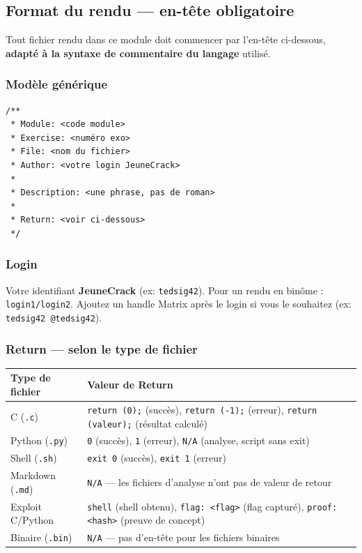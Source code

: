 \subsection*{Format du rendu --- en-tête obligatoire}

Tout fichier rendu dans ce module doit commencer par l'en-tête
ci-dessous, \textbf{adapté à la syntaxe de commentaire du langage}
utilisé.

\subsubsection*{Modèle générique}

\begin{verbatim}
/**
 * Module: <code module>
 * Exercise: <numéro exo>
 * File: <nom du fichier>
 * Author: <votre login JeuneCrack>
 *
 * Description: <une phrase, pas de roman>
 *
 * Return: <voir ci-dessous>
 */
\end{verbatim}

\subsubsection*{Login}

Votre identifiant \textbf{JeuneCrack} (ex: \texttt{tedsig42}).
Pour un rendu en binôme : \texttt{login1/login2}.
Ajoutez un handle Matrix après le login si vous le souhaitez
(ex: \texttt{tedsig42 @tedsig42}).

\subsubsection*{Return --- selon le type de fichier}

\begin{tabularx}{\linewidth}{lX}
  \toprule
  \textbf{Type de fichier} & \textbf{Valeur de Return} \\
  \midrule
  C (\texttt{.c}) &
  \texttt{return (0);} (succès),
  \texttt{return (-1);} (erreur),
  \texttt{return (valeur);} (résultat calculé) \\

  Python (\texttt{.py}) &
  \texttt{0} (succès),
  \texttt{1} (erreur),
  \texttt{N/A} (analyse, script sans exit) \\

  Shell (\texttt{.sh}) &
  \texttt{exit 0} (succès),
  \texttt{exit 1} (erreur) \\

  Markdown (\texttt{.md}) &
  \texttt{N/A} --- les fichiers d'analyse n'ont pas de valeur de retour \\

  Exploit C/Python &
  \texttt{shell} (shell obtenu),
  \texttt{flag: <flag>} (flag capturé),
  \texttt{proof: <hash>} (preuve de concept) \\

  Binaire (\texttt{.bin}) &
  \texttt{N/A} --- pas d'en-tête pour les fichiers binaires \\
  \bottomrule
\end{tabularx}

